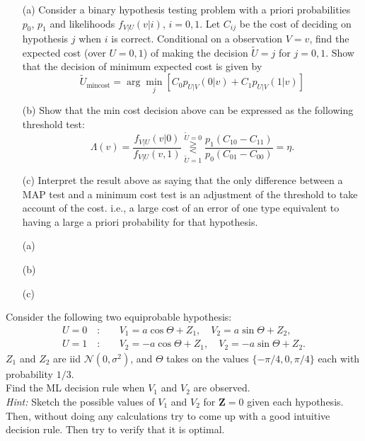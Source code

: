 \documentclass{assignment}
\begin{document}
\begin{prob}
    \begin{itemize}
        \item[(a)] Consider a binary hypothesis testing problem with a priori probabilities $p_0$, $p_1$ and likelihoods $f_{V\vert U}(v\vert i)$, $i=0,1$. Let $C_{ij}$ be the cost of deciding on hypothesis $j$ when $i$ is correct. Conditional on a observation $V=v$, find the expected cost (over $U=0,1$) of making the decision $\tilde{U}=j$ for $j=0,1$. Show that the decision of minimum expected cost is given by
        \[
            \tilde{U}_{\text{mincost}}=\arg\min_j\left[C_0p_{U\vert V}(0\vert v)+C_1p_{U\vert V}(1\vert v)\right]
        \]
        \item[(b)] Show that the min cost decision above can be expressed as the following threshold test:
        \[
            \Lambda(v)=\frac{f_{V\vert U}(v\vert 0)}{f_{V\vert U}(v,1)}\overset{\tilde{U}=0}{\underset{\tilde{U}=1}{\gtreqless}}\frac{p_1(C_{10}-C_{11})}{p_0(C_{01}-C_{00})}=\eta.
        \]
        \item[(c)] Interpret the result above as saying that the only difference between a MAP test and a minimum cost test is an adjustment of the threshold to take account of the cost. i.e., a large cost of an error of one type equivalent to having a large a priori probability for that hypothesis.
    \end{itemize}
\end{prob}
\begin{sol}
    \begin{itemize}
        \item[(a)] 
        \item[(b)] 
        \item[(c)] 
    \end{itemize}
\end{sol}

\begin{prob}
    Consider the following two equiprobable hypothesis:
    \begin{align*}
        U=0\quad:&\quad V_1=a\cos\Theta+Z_1,\quad V_2=a\sin\Theta+Z_2,\\
        U=1\quad:&\quad V_2=-a\cos\Theta+Z_1,\quad V_2=-a\sin\Theta+Z_2.
    \end{align*}
    $Z_1$ and $Z_2$ are iid $\mathcal{N}(0,\sigma^2)$, and $\Theta$ takes on the values $\{-\pi/4,0,\pi/4\}$ each with probability $1/3$.\\
    Find the ML decision rule when $V_1$ and $V_2$ are observed.\\
    \emph{Hint:} Sketch the possible values of $V_1$ and $V_2$ for $\bm{Z}=0$ given each hypothesis. Then, without doing any calculations try to come up with a good intuitive decision rule. Then try to verify that it is optimal.
\end{prob}
\begin{sol}
    
\end{sol}
\end{document}
